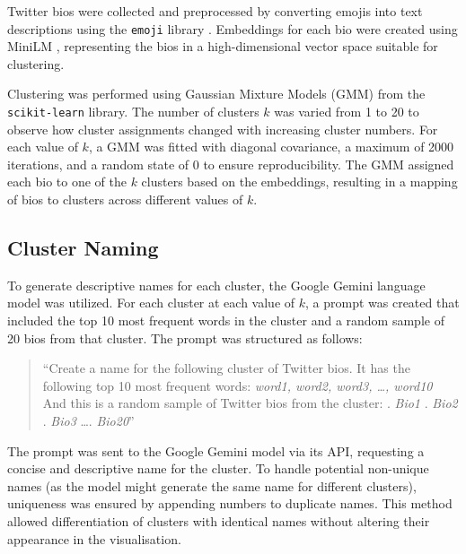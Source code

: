 \documentclass{article}
\begin{document}
Twitter bios were collected and preprocessed by converting emojis into text descriptions using the \texttt{emoji} library \cite{2022emoji}.  Embeddings for each bio were created using MiniLM \cite{wang2020}, representing the bios in a high-dimensional vector space suitable for clustering.

Clustering was performed using Gaussian Mixture Models (GMM) from the \texttt{scikit-learn} library. The number of clusters $k$ was varied from 1 to 20 to observe how cluster assignments changed with increasing cluster numbers. For each value of $k$, a GMM was fitted with diagonal covariance, a maximum of 2000 iterations, and a random state of 0 %
to ensure reproducibility. The GMM assigned each bio to one of the $k$ clusters based on the embeddings, resulting in a mapping of bios to clusters across different values of $k$.

\subsection*{Cluster Naming}

To generate descriptive names for each cluster, the Google Gemini language model was utilized. For each cluster at each value of $k$, a prompt was created that included the top 10 most frequent words in the cluster and a random sample of 20 bios from that cluster. The prompt was structured as follows:

\begin{quote}
``Create a name for the following cluster of Twitter bios. It has the following top 10 most frequent words: \newline
\textit{word1, word2, word3, \dots, word10} \newline
And this is a random sample of Twitter bios from the cluster:
. \textit{Bio1} . \textit{Bio2} . \textit{Bio3} \newline
\dots {}. \textit{Bio20}''
\end{quote}

The prompt was sent to the Google Gemini model via its API, requesting a concise and descriptive name for the cluster. To handle potential non-unique names (as the model might generate the same name for different clusters), uniqueness was ensured by appending numbers to duplicate names. This method allowed differentiation of clusters with identical names without altering their appearance in the visualisation.
\end{document}
